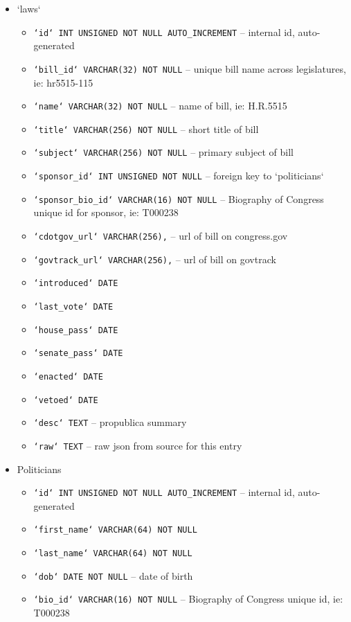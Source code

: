 \documentclass[12pt]{article}
\newcommand{\code}[1]{\texttt{#1}}
\begin{document}
\begin{itemize}
	\item[] `laws`
	\begin{itemize}
		\item \code{`id` INT UNSIGNED NOT NULL AUTO\_INCREMENT}	-- internal id, auto-generated
		\item \code{`bill\_id` VARCHAR(32) NOT NULL}			-- unique bill name across legislatures, ie: hr5515-115
		\item \code{`name` VARCHAR(32) NOT NULL}				-- name of bill, ie: H.R.5515
		\item \code{`title` VARCHAR(256) NOT NULL}				-- short title of bill
		\item \code{`subject` VARCHAR(256) NOT NULL}			-- primary subject of bill
		\item \code{`sponsor\_id` INT UNSIGNED NOT NULL}		-- foreign key to `politicians`
		\item \code{`sponsor\_bio\_id` VARCHAR(16) NOT NULL}	-- Biography of Congress unique id for sponsor, ie: T000238
		\item \code{`cdotgov\_url` VARCHAR(256),}				-- url of bill on congress.gov
		\item \code{`govtrack\_url` VARCHAR(256),}				-- url of bill on govtrack
		\item \code{`introduced` DATE}
		\item \code{`last\_vote` DATE}
		\item \code{`house\_pass` DATE}
		\item \code{`senate\_pass` DATE}
		\item \code{`enacted` DATE}
		\item \code{`vetoed` DATE}
		\item \code{`desc` TEXT}								-- propublica summary
		\item \code{`raw` TEXT}									-- raw json from source for this entry
	\end{itemize}
	\item[] Politicians
	\begin{itemize}
		\item \code{`id` INT UNSIGNED NOT NULL AUTO\_INCREMENT}	-- internal id, auto-generated
		\item \code{`first\_name` VARCHAR(64) NOT NULL}
		\item \code{`last\_name` VARCHAR(64) NOT NULL}
		\item \code{`dob` DATE NOT NULL}						-- date of birth
		\item \code{`bio\_id` VARCHAR(16) NOT NULL}				-- Biography of Congress unique id, ie: T000238

\end{itemize}
\end{itemize}
\end{document}
